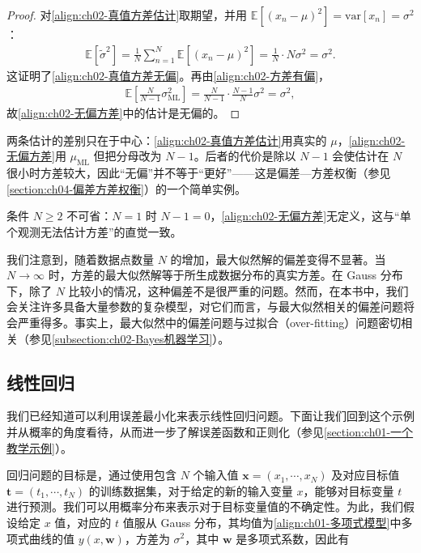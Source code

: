 \documentclass[../../main.tex]{subfiles}
\begin{document}
\begin{proof}
对\eqref{align:ch02-真值方差估计}取期望，并用 $\mathbb{E}[(x_n-\mu)^{2}]=\mathrm{var}[x_n]=\sigma^{2}$：
\begin{align*}
 \mathbb{E}\left[\tilde{\sigma}^{2}\right] = \frac{1}{N}\sum_{n=1}^{N}\mathbb{E}\left[(x_n-\mu)^{2}\right] = \frac{1}{N}\cdot N\sigma^{2} = \sigma^{2} .
\end{align*}
这证明了\eqref{align:ch02-真值方差无偏}。再由\eqref{align:ch02-方差有偏}，
\begin{align*}
 \mathbb{E}\left[\frac{N}{N-1}\sigma_{\mathrm{ML}}^{2}\right] = \frac{N}{N-1}\cdot\frac{N-1}{N}\sigma^{2} = \sigma^{2},
\end{align*}
故\eqref{align:ch02-无偏方差}中的估计是无偏的。
\end{proof}

\begin{remark}
两条估计的差别只在于中心：\eqref{align:ch02-真值方差估计}用真实的 $\mu$，\eqref{align:ch02-无偏方差}用 $\mu_{\mathrm{ML}}$ 但把分母改为 $N-1$。后者的代价是除以 $N-1$ 会使估计在 $N$ 很小时方差较大，因此“无偏”并不等于“更好”——这是偏差—方差权衡（参见\cref{section:ch04-偏差方差权衡}）的一个简单实例。

条件 $N\geqslant2$ 不可省：$N=1$ 时 $N-1=0$，\eqref{align:ch02-无偏方差}无定义，这与“单个观测无法估计方差”的直觉一致。
\end{remark}

我们注意到，随着数据点数量 $N$ 的增加，最大似然解的偏差变得不显著。当 $N\to\infty$ 时，方差的最大似然解等于所生成数据分布的真实方差。在 Gauss 分布下，除了 $N$ 比较小的情况，这种偏差不是很严重的问题。然而，在本书中，我们会关注许多具备大量参数的复杂模型，对它们而言，与最大似然相关的偏差问题将会严重得多。事实上，最大似然中的偏差问题与过拟合（over-fitting）问题密切相关（参见\cref{subsection:ch02-Bayes机器学习}）。

\subsection{线性回归}\label{subsection:ch02-线性回归}

我们已经知道可以利用误差最小化来表示线性回归问题。下面让我们回到这个示例并从概率的角度看待，从而进一步了解误差函数和正则化（参见\cref{section:ch01-一个教学示例}）。

回归问题的目标是，通过使用包含 $N$ 个输入值 $\mathbf{x}=(x_1,\cdots,x_N)$ 及对应目标值 $\mathbf{t}=(t_1,\cdots,t_N)$ 的训练数据集，对于给定的新的输入变量 $x$，能够对目标变量 $t$ 进行预测。我们可以用概率分布来表示对于目标变量值的不确定性。为此，我们假设给定 $x$ 值，对应的 $t$ 值服从 Gauss 分布，其均值为\eqref{align:ch01-多项式模型}中多项式曲线的值 $y(x,\mathbf{w})$，方差为 $\sigma^{2}$，其中 $\mathbf{w}$ 是多项式系数，因此有
\end{document}
